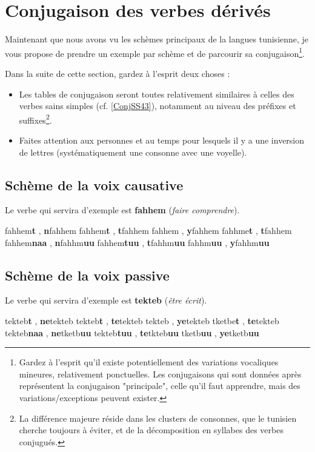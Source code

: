 \section{Conjugaison des verbes dérivés}
Maintenant que nous avons vu les schèmes principaux de la langues tunisienne, je vous propose de prendre un exemple par schème et de parcourir sa conjugaison\footnote{Gardez à l'esprit qu'il existe potentiellement des variations vocaliques mineures, relativement ponctuelles. Les conjugaisons qui sont données après représentent la conjugaison "principale", celle qu'il faut apprendre, mais des variations/exceptions peuvent exister.}.

Dans la suite de cette section, gardez à l'esprit deux choses : 
\begin{itemize}
    \item Les tables de conjugaison seront toutes relativement similaires à celles des verbes sains simples (cf. \ref{ConjSS43}), notamment au niveau des préfixes et suffixes\footnote{La différence majeure réside dans les clusters de consonnes, que le tunisien cherche toujours à éviter, et de la décomposition en syllabes des verbes conjugués.}. 
    \item Faites attention aux personnes et au temps pour lesquels il y a une inversion de lettres (systématiquement une consonne avec une voyelle).
\end{itemize}

\subsection{Schème de la voix causative}
Le verbe qui servira d'exemple est \textbf{fahhem} (\textit{faire comprendre}).

    {fahhem\textbf{t} , \textbf{n}fahhem}
    {fahhem\textbf{t} , \textbf{t}fahhem} 
    {fahhem , \textbf{y}fahhem}
    {fahhme\textbf{t} , \textbf{t}fahhem}
    {fahhem\textbf{naa} , \textbf{n}fahhm\textbf{uu}}
    {fahhem\textbf{tuu} , \textbf{t}fahhm\textbf{uu}} 
    {fahhm\textbf{uu} , \textbf{y}fahhm\textbf{uu}} 


\subsection{Schème de la voix passive}
Le verbe qui servira d'exemple est \textbf{tekteb} (\textit{être écrit}).


 {tekteb\textbf{t} , \textbf{ne}tekteb}
 {tekteb\textbf{t} , \textbf{te}tekteb} 
 {tekteb , \textbf{ye}tekteb}
 {tketbe\textbf{t} , \textbf{te}tekteb}
 {tekteb\textbf{naa} , \textbf{ne}tketb\textbf{uu}}
 {tekteb\textbf{tuu} , \textbf{te}tkteb\textbf{uu}}
 {tketb\textbf{uu} , \textbf{ye}tketb\textbf{uu}}

